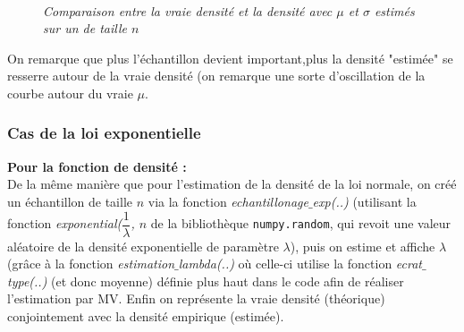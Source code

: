 \documentclass{article}      %
\begin{document}
\begin{figure}[H]
	\centering
	\\
	\textit{Comparaison entre la vraie densité et la densité avec $\mu$ et $\sigma$ estimés sur un  de taille $n$}
\end{figure}

On remarque que plus l'échantillon devient important,plus la densité "estimée" se resserre autour de la vraie densité (on remarque une sorte d'oscillation de la courbe autour du vraie $\mu$.\\


\subsubsection{Cas de la loi exponentielle}

\textbf{Pour la fonction de densité :}\\

De la même manière que pour l'estimation de la densité de la loi normale, on créé un échantillon de taille $n$ via la fonction \textit{echantillonage$\_$exp(..)} (utilisant la fonction \textit{exponential($\dfrac{1}{\lambda}$, $n$} de la bibliothèque \texttt{numpy.random}, qui revoit une valeur aléatoire de la densité exponentielle de paramètre $\lambda$), puis on estime et affiche $\lambda$ (grâce à la fonction \textit{estimation$\_$lambda(..)} où celle-ci utilise la fonction \textit{ecrat$\_$type(..)} (et donc moyenne) définie plus haut dans le code afin de réaliser l'estimation par MV. Enfin on représente la vraie densité (théorique) conjointement avec la densité empirique (estimée).\\
\end{document}
